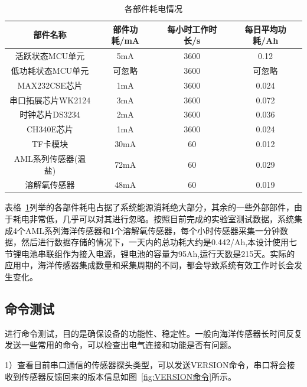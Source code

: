 \begin{table}[ht]
\caption{各部件耗电情况}
  \label{tab:各部件耗电情况}
\centering
    \begin{tabular}{|c|c|c|c|}
        \toprule
 {\bf 部件名称}&{\bf 部件功耗/mA} & {\bf 每小时工作时长/s} & {\bf 每日平均功耗/Ah}\\    
        \hline
 {活跃状态MCU单元}&{5mA} & {3600}&{0.12}\\      
        \hline
 {低功耗状态MCU单元}&{可忽略} & {3600}&{可忽略}\\      
        \hline
 {MAX232CSE芯片}&{1mA} & {3600}&{0.024}\\      
        \hline
 {串口拓展芯片WK2124}&{3mA} & {3600}&{0.072}\\      
        \hline
 {时钟芯片DS3234}&{2mA} & {3600}&{0.036}\\      
        \hline
{CH340E芯片}&{1mA} & {3600}&{0.024}\\      
        \hline
{TF卡模块}&{30mA} & {60}&{0.012}\\      
        \hline
{AML系列传感器(温盐)}&{72mA} & {60}&{0.029}\\      
        \hline
{溶解氧传感器}&{48mA} & {60}&{0.019}\\      
        \hline
    \end{tabular}
\end{table}
表格~\ref{tab:各部件耗电情况}列举的各部件耗电占据了系统能源消耗绝大部分，其余的一些外部部件，由于耗电非常低，几乎可以对其进行忽略。按照目前完成的实验室测试数据，系统集成4个AML系列海洋传感器和1个溶解氧传感器，每个小时传感器采集一分钟数据，然后进行数据存储的情况下，一天内的总功耗大约是0.442/Ah,本设计使用七节锂电池串联组作为接入电源，锂电池的容量为95Ah,运行天数是215天。实际的应用中，海洋传感器集成数量和采集周期的不同，都会导致系统有效工作时长会发生变化。
\subsection{命令测试}
进行命令测试，目的是确保设备的功能性、稳定性。一般向海洋传感器长时间反复发送一些常用的命令，可以检查出电气连接和功能是否有问题。

1）查看目前串口通信的传感器探头类型，可以发送VERSION命令，串口将会接收到传感器反馈回来的版本信息如图~\ref{fig:VERSION命令}所示。

